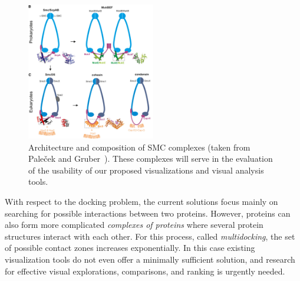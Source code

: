 \documentclass[11pt,a4paper,titlepage,oneside,onecolumn]{article}
\begin{document}
\setlength\intextsep{0pt}
\begin{figure}
  \begin{center}
  \includegraphics[width=0.5\textwidth,height=0.48\textwidth]{pics/telomer.png}
	\end{center}
	\vspace{-20pt}
  \caption{Architecture and composition of SMC complexes (taken from Pale\v{c}ek and Gruber~\cite{Palecek2015}). These complexes will serve in the evaluation of the usability of our proposed visualizations and visual analysis tools.}
  \label{fig:telomere}
\end{figure}

With respect to the docking problem, the current solutions focus mainly on searching for possible interactions between two proteins.
However, proteins can also form more complicated \textit{complexes of proteins} where several protein structures interact with each other.
For this process, called \textit{multidocking}, the set of possible contact zones increases exponentially. 
In this case existing visualization tools do not even offer a minimally sufficient solution, and research for effective visual explorations, comparisons, and ranking is urgently needed.
\end{document}
